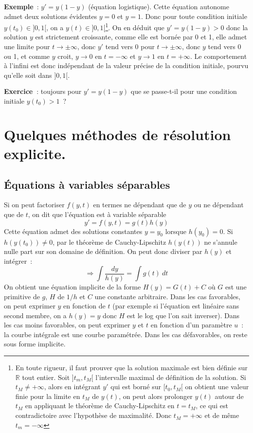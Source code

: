 \documentclass[a4paper,11pt]{book}
\begin{document}
\begin{giacjshere}
{\bf Exemple}~: $y'=y(1-y)$ (\'equation logistique). 
Cette \'equation autonome admet deux solutions
\'evidentes $y=0$ et $y=1$. Donc pour toute condition initiale $y(t_0)
\in ]0,1[$, on a $y(t) \in ]0,1[$\footnote{En toute rigueur,
il faut prouver que la solution maximale est bien d\'efinie sur
$\mathbb{R}$ tout entier. Soit $]t_m,t_M[$ l'intervalle maximal de
d\'efinition de la solution. Si $t_M \neq +\infty$,
alors en int\'egrant $y'$ qui est born\'e sur $[t_0,t_M[$ 
on obtient une valeur finie pour la limite en $t_M$ de $y(t)$,
on peut alors prolonger $y(t)$ autour de $t_M$
en appliquant le th\'eor\`eme de Cauchy-Lipschitz en $t=t_M$,
ce qui est contradictoire avec l'hypoth\`ese de maximalit\'e. 
Donc $t_M=+\infty$ et de m\^eme $t_m=-\infty$}. 
On en d\'eduit que $y'=y(1-y)>0$
donc la solution $y$ est strictement croissante, comme elle est
born\'ee par 0 et 1, elle admet une limite pour $t \rightarrow \pm
\infty$, donc $y'$ tend vers 0 pour $t \rightarrow \pm
\infty$, donc $y$ tend vers 0 ou 1, et comme $y$ croit, 
$y \rightarrow 0$ en $t=-\infty$ et $y \rightarrow 1$ en $t=+\infty$.
Le comportement \`a l'infini est donc ind\'ependant de la valeur
pr\'ecise de la condition initiale, pourvu qu'elle soit dans $]0,1[$.

{\bf Exercice~}: toujours pour $y'=y(1-y)$ que se passe-t-il pour une
condition initiale $y(t_0)>1$~?

\section{Quelques m\'ethodes de r\'esolution explicite.}

\subsection{\'Equations \`a variables
  s\'eparables}
Si on peut factoriser $f(y,t)$ en termes ne d\'ependant que
de $y$ ou ne d\'ependant que de $t$, on dit que l'\'equation
est \`a variable s\'eparable $$y'=f(y,t)=g(t)h(y)$$
Cette \'equation admet des solutions constantes $y=y_0$ lorsque
$h(y_0)=0$. Si $h(y(t_0)) \neq 0$, par le th\'eor\`eme de
Cauchy-Lipschitz $h(y(t))$ ne s'annule nulle part sur son domaine
de d\'efinition. On peut donc diviser par $h(y)$ et 
int\'egrer~:
$$ \Rightarrow \int \frac{dy}{h(y)} = \int g(t) \ 
dt$$
On obtient une \'equation implicite de la forme $H(y)=G(t)+C$ o\`u
$G$ est une primitive de $g$, $H$ de $1/h$ et $C$ une constante
arbitraire. Dans les cas favorables, on peut exprimer $y$ en fonction
de $t$ (par exemple si l'\'equation est lin\'eaire sans second membre,
on a $h(y)=y$ donc $H$ est le log que l'on sait
inverser). Dans les cas moins favorables, on peut exprimer $y$ et
$t$ en fonction d'un param\`etre $u$~: la courbe int\'egrale est
une courbe param\'etr\'ee. Dans les cas d\'efavorables, on reste
sous forme implicite.


\end{giacjshere}
\end{document}
